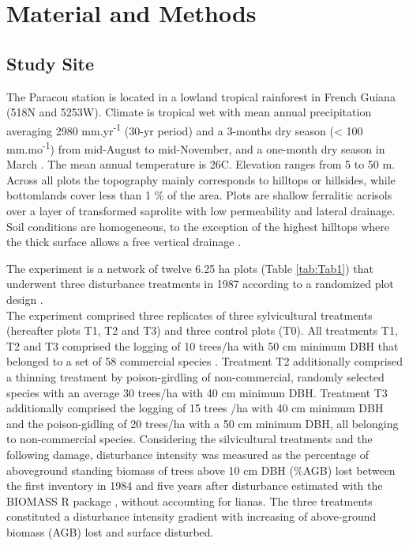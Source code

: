 \documentclass[fleqn,10pt]{ArtEcoFoG} %
\begin{document}
\section{Material and Methods}\label{material-and-methods}

\subsection{Study Site}\label{study-site}

The Paracou station is located in a lowland tropical rainforest in
French Guiana (518\textdegree N and 5253\textdegree W). Climate is
tropical wet with mean annual precipitation averaging 2980
mm.yr\textsuperscript{-1} (30-yr period) and a 3-months dry season
(\textless{} 100 mm.mo\textsuperscript{-1}) from mid-August to
mid-November, and a one-month dry season in March \citep{Wagner2011}.
The mean annual temperature is 26\textdegree C. Elevation ranges from 5
to 50 m. Across all plots the topography mainly corresponds to hilltops
or hillsides, while bottomlands cover less than 1 \% of the area. Plots
are shallow ferralitic acrisols over a layer of transformed saprolite
with low permeability and lateral drainage. Soil conditions are
homogeneous, to the exception of the highest hilltops where the thick
surface allows a free vertical drainage \citep{Gourlet-Fleury2004}.

The experiment is a network of twelve 6.25 ha plots (Table
\ref{tab:Tab1}) that underwent three disturbance treatments in 1987
according to a randomized plot design \citep{Herault2018}.\\
The experiment comprised three replicates of three sylvicultural
treatments (hereafter plots T1, T2 and T3) and three control plots (T0).
All treatments T1, T2 and T3 comprised the logging of 10 trees/ha with
50 cm minimum DBH that belonged to a set of 58 commercial species
\citep{Gourlet-Fleury2004}. Treatment T2 additionally comprised a
thinning treatment by poison-girdling of non-commercial, randomly
selected species with an average 30 trees/ha with 40 cm minimum DBH.
Treatment T3 additionally comprised the logging of 15 trees /ha with 40
cm minimum DBH and the poison-gidling of 20 trees/ha with a 50 cm
minimum DBH, all belonging to non-commercial species. Considering the
silvicultural treatments and the following damage, disturbance intensity
was measured as the percentage of aboveground standing biomass of trees
above 10 cm DBH (\%AGB) lost between the first inventory in 1984 and
five years after disturbance \citep{Piponiot2016} estimated with the
BIOMASS R package \citep{Biomass2018}, without accounting for lianas.
The three treatments constituted a disturbance intensity gradient with
increasing of above-ground biomass (AGB) lost and surface disturbed.
\end{document}
